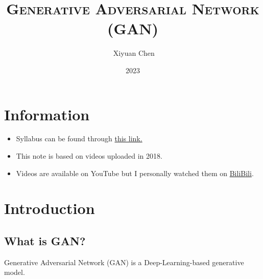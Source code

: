 \documentclass{../templates/ainote}
\author{\ccLogo \,\,Xiyuan Chen}
\title{\textsc{Generative Adversarial Network (GAN)}}
\date{2023}
\begin{document}
\maketitle
\doclicenseThis
\section*{Information}
\begin{itemize}
	\item Syllabus can be found through \href{http://speech.ee.ntu.edu.tw/~tlkagk/courses_MLDS18.html}{this link. }
	\item This note is based on videos uploaded in 2018.
    \item Videos are available on YouTube but I personally watched them on \href{https://www.bilibili.com/video/BV1Up411R7Lk}{BiliBili}.
\end{itemize}
\tableofcontents
\newpage

\section{Introduction}

\subsection{What is GAN?}
Generative Adversarial Network (GAN) is a Deep-Learning-based generative model. 
\end{document}
